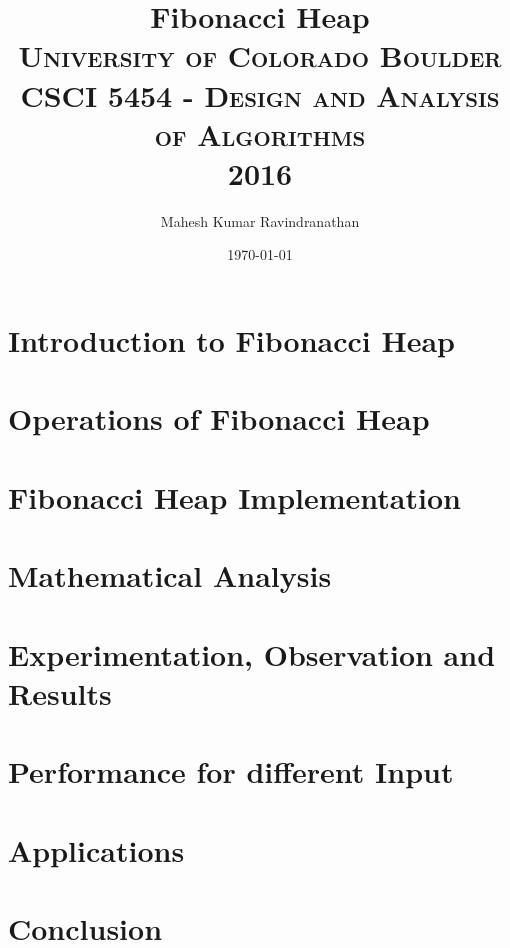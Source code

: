 \documentclass[10pt]{sig-alternate-05-2015}
\title{Fibonacci Heap \\ \textsc{University of Colorado Boulder} \\ \textsc{CSCI 5454 - Design and Analysis of Algorithms} \\ \textsc{2016} } %
\author{Mahesh Kumar Ravindranathan } %
\date{\today} %
\begin{document}
\maketitle %


\section{Introduction to Fibonacci Heap}

\section{Operations of Fibonacci Heap}

\section{Fibonacci Heap Implementation}

\section{Mathematical Analysis}

\section{Experimentation, Observation and Results}

\section{Performance for different Input}

\section{Applications}

\section{Conclusion}




\nocite{abuaiadh1994fibonacci}
\nocite{princeton}
\end{document}
